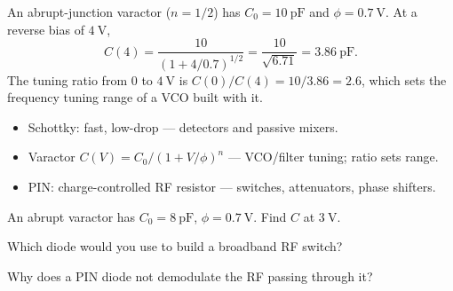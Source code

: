 \begin{workedexample}
An abrupt-junction varactor ($n = 1/2$) has $C_0 = 10\ \text{pF}$ and
$\phi = 0.7\ \text{V}$. At a reverse bias of $4\ \text{V}$,
\[ C(4) = \frac{10}{(1 + 4/0.7)^{1/2}} = \frac{10}{\sqrt{6.71}} = 3.86\ \text{pF}. \]
The tuning ratio from $0$ to $4\ \text{V}$ is $C(0)/C(4) = 10/3.86 = 2.6$, which
sets the frequency tuning range of a VCO built with it.
\end{workedexample}

\begin{keytakeaways}
\begin{itemize}[leftmargin=1.4em,itemsep=2pt]
\item Schottky: fast, low-drop --- detectors and passive mixers.
\item Varactor $C(V)=C_0/(1+V/\phi)^n$ --- VCO/filter tuning; ratio sets range.
\item PIN: charge-controlled RF resistor --- switches, attenuators, phase shifters.
\end{itemize}
\end{keytakeaways}

\begin{exercises}
\item An abrupt varactor has $C_0 = 8\ \text{pF}$, $\phi = 0.7\ \text{V}$. Find $C$ at $3\ \text{V}$.
\item Which diode would you use to build a broadband RF switch?
\item Why does a PIN diode not demodulate the RF passing through it?
\end{exercises}

